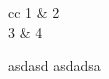 \begin{myother}{cc}%
	1 & 2 \\
	3 & 4 \\
\end{myother}

\begin{other}
  asdasd
  asdadsa
\end{other}
